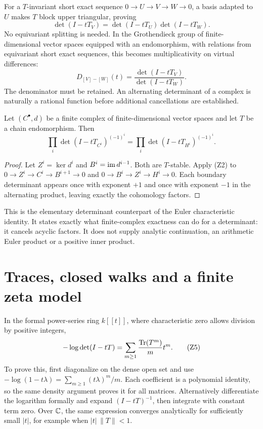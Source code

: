 For a \(T\)-invariant short exact sequence \(0\to U\to V\to W\to0\), a basis adapted to \(U\) makes \(T\) block upper triangular, proving
\[
 \det(I-tT_V)=\det(I-tT_U)\det(I-tT_W).
 \tag{Z2}
\]
No equivariant splitting is needed. In the Grothendieck group of finite-dimensional vector spaces equipped with an endomorphism, with relations from equivariant short exact sequences, this becomes multiplicativity on virtual differences:
\[
 D_{[V]-[W]}(t)=\frac{\det(I-tT_V)}{\det(I-tT_W)}.
 \tag{Z3}
\]
The denominator must be retained. An alternating determinant of a complex is naturally a rational function before additional cancellations are established.

\begin{proposition}
Let \((C^\bullet,d)\) be a finite complex of finite-dimensional vector spaces and let \(T\) be a chain endomorphism. Then
\[
 \prod_i\det(I-tT_{C^i})^{(-1)^i}
   =\prod_i\det(I-tT_{H^i})^{(-1)^i}.
 \tag{Z4}\label{eq:cohomological-determinant}
\]
\end{proposition}
\begin{proof}
Let \(Z^i=\ker d^i\) and \(B^i=\operatorname{im} d^{i-1}\). Both are \(T\)-stable. Apply (Z2) to
\(0\to Z^i\to C^i\to B^{i+1}\to0\) and
\(0\to B^i\to Z^i\to H^i\to0\).
Each boundary determinant appears once with exponent \(+1\) and once with exponent \(-1\) in the alternating product, leaving exactly the cohomology factors.
\end{proof}
This is the elementary determinant counterpart of the Euler characteristic identity. It states exactly what finite-complex exactness can do for a determinant: it cancels acyclic factors. It does not supply analytic continuation, an arithmetic Euler product or a positive inner product.

\section{Traces, closed walks and a finite zeta model}
In the formal power-series ring \(k[[t]]\), where characteristic zero allows division by positive integers,
\[
 -\log\det(I-tT)=\sum_{m\ge1}\frac{\operatorname{Tr}(T^m)}{m}t^m.
 \tag{Z5}
\]
To prove this, first diagonalize on the dense open set and use
\(-\log(1-t\lambda)=\sum_{m\ge1}(t\lambda)^m/m\). Each coefficient is a polynomial identity, so the same density argument proves it for all matrices. Alternatively differentiate the logarithm formally and expand \((I-tT)^{-1}\), then integrate with constant term zero. Over \(\mathbb{C}\), the same expression converges analytically for sufficiently small \(|t|\), for example when \(|t|\,\|T\|<1\).

